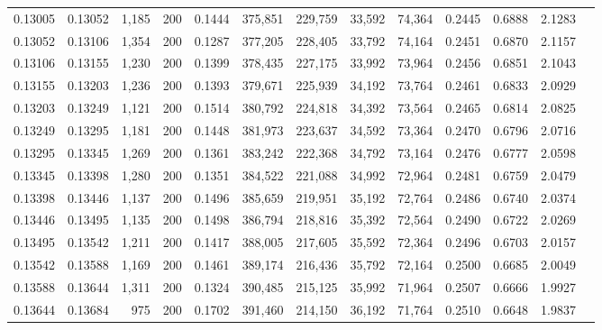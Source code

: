 \begin{tabular}{rrrrrrrrrrrrr}
0.13005 & 0.13052 & 1,185 & 200 &                                     0.1444 & 375,851 & 229,759 &  33,592 &  74,364 & 0.2445 & 0.6888 & 2.1283 \\
0.13052 & 0.13106 & 1,354 & 200 &                                     0.1287 & 377,205 & 228,405 &  33,792 &  74,164 & 0.2451 & 0.6870 & 2.1157 \\
0.13106 & 0.13155 & 1,230 & 200 &                                     0.1399 & 378,435 & 227,175 &  33,992 &  73,964 & 0.2456 & 0.6851 & 2.1043 \\
0.13155 & 0.13203 & 1,236 & 200 &                                     0.1393 & 379,671 & 225,939 &  34,192 &  73,764 & 0.2461 & 0.6833 & 2.0929 \\
0.13203 & 0.13249 & 1,121 & 200 &                                     0.1514 & 380,792 & 224,818 &  34,392 &  73,564 & 0.2465 & 0.6814 & 2.0825 \\
0.13249 & 0.13295 & 1,181 & 200 &                                     0.1448 & 381,973 & 223,637 &  34,592 &  73,364 & 0.2470 & 0.6796 & 2.0716 \\
0.13295 & 0.13345 & 1,269 & 200 &                                     0.1361 & 383,242 & 222,368 &  34,792 &  73,164 & 0.2476 & 0.6777 & 2.0598 \\
0.13345 & 0.13398 & 1,280 & 200 &                                     0.1351 & 384,522 & 221,088 &  34,992 &  72,964 & 0.2481 & 0.6759 & 2.0479 \\
0.13398 & 0.13446 & 1,137 & 200 &                                     0.1496 & 385,659 & 219,951 &  35,192 &  72,764 & 0.2486 & 0.6740 & 2.0374 \\
0.13446 & 0.13495 & 1,135 & 200 &                                     0.1498 & 386,794 & 218,816 &  35,392 &  72,564 & 0.2490 & 0.6722 & 2.0269 \\
0.13495 & 0.13542 & 1,211 & 200 &                                     0.1417 & 388,005 & 217,605 &  35,592 &  72,364 & 0.2496 & 0.6703 & 2.0157 \\
0.13542 & 0.13588 & 1,169 & 200 &                                     0.1461 & 389,174 & 216,436 &  35,792 &  72,164 & 0.2500 & 0.6685 & 2.0049 \\
0.13588 & 0.13644 & 1,311 & 200 &                                     0.1324 & 390,485 & 215,125 &  35,992 &  71,964 & 0.2507 & 0.6666 & 1.9927 \\
0.13644 & 0.13684 &   975 & 200 &                                     0.1702 & 391,460 & 214,150 &  36,192 &  71,764 & 0.2510 & 0.6648 & 1.9837 \\

\end{tabular}

